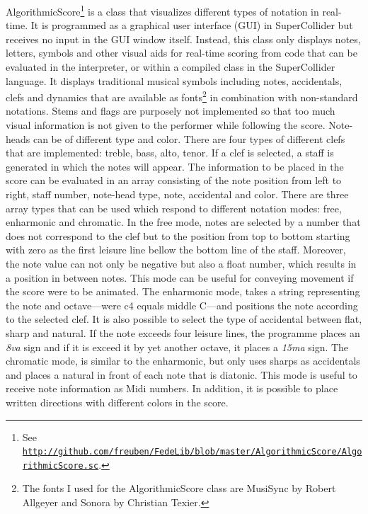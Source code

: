 AlgorithmicScore\footnote{See \href{http://github.com/freuben/FedeLib/blob/master/AlgorithmicScore/AlgorithmicScore.sc} {\texttt{http://github.com/freuben/FedeLib/blob/master/AlgorithmicScore/AlgorithmicScore.sc}}.} is a class that visualizes different types of notation in real-time. It is programmed as a graphical user interface (GUI) in SuperCollider but receives no input in the GUI window itself. Instead, this class only displays notes, letters, symbols and other visual aids for real-time scoring from code that can be evaluated in the interpreter, or within a compiled class in the SuperCollider language. It displays traditional musical symbols including notes, accidentals, clefs and dynamics that are available as fonts\footnote{The fonts I used for the AlgorithmicScore class are MusiSync by Robert Allgeyer and Sonora by Christian Texier.} in combination with non-standard notations. Stems and flags are purposely not implemented so that too much visual information is not given to the performer while following the score. Note-heads can be of different type and color. There are four types of different clefs that are implemented: treble, bass, alto, tenor.  If a clef is selected, a staff is generated in which the notes will appear. The information to be placed in the score can be evaluated in an array consisting of the note position from left to right, staff number, note-head type, note, accidental and color. There are three array types that can be used which respond to different notation modes: free, enharmonic and chromatic. In the free mode, notes are selected by a number that does not correspond to the clef but to the position from top to bottom starting with zero as the first leisure line bellow the bottom line of the staff. Moreover, the note value can not only be negative but also a float number, which results in a position in between notes. This mode can be useful for conveying movement if the score were to be animated. The enharmonic mode, takes a string representing the note and octave---were c4 equals middle C---and positions the note according to the selected clef. It is also possible to select the type of accidental between flat, sharp and natural. If the note exceeds four leisure lines, the programme places an \emph{8va} sign and if it is exceed it by yet another octave, it places a \emph{15ma} sign. The chromatic mode, is similar to the enharmonic, but only uses sharps as accidentals and places a natural in front of each note that is diatonic. This mode is useful to receive note information as Midi numbers. In addition, it is possible to place written directions with different colors in the score.

